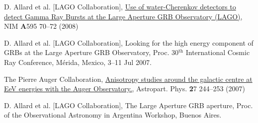 \begin{etaremune}
\item {}D. Allard { et al.} [LAGO Collaboration],
\href{http://dx.doi.org/10.1016/j.nima.2008.07.041}{{Use of
water-Cherenkov detectors to detect Gamma Ray Bursts at the Large Aperture GRB
Observatory (LAGO)}}, NIM {\textbf A595} 70--72 (2008)

\item {}D. Allard { et al.} [LAGO Collaboration], {{Looking for
the high energy component of GRBs at the Large Aperture GRB Observatory}}, \en
Proc.
30$^{\mathrm{th}}$ International Cosmic Ray Conference,  Mérida, Mexico, 3--11 Jul
2007.

\item {}The Pierre Auger Collaboration,
\href{http://dx.doi.org/10.1016/j.astropartphys.2006.11.002}{{Anisotropy
studies around the galactic centre at EeV energies with the Auger
Observatory.}},  Astropart.
Phys. {\textbf 27} 244--253 (2007)

\item {}D. Allard { et al.} [LAGO Collaboration], {{The Large
Aperture GRB aperture}}, \en Proc.
of the Observational Astronomy in Argentina
Workshop, Buenos Aires.

\end{etaremune}